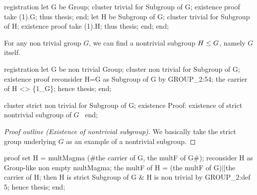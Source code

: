 \nwenddocs{}\endmoddef\nwstartdeflinemarkup{}\nwenddeflinemarkup
registration
  let G be Group;
  cluster trivial for Subgroup of G;
  existence
  proof
    take (1).G;
    thus thesis;
  end;
  let H be Subgroup of G;
  cluster trivial for Subgroup of H;
  existence
  proof
    take (1).H;
    thus thesis;
  end;
end;
\eatline
{}\nwendcode{}\nwdocspar
\begin{registration}
For any non trivial group $G$, we can find a nontrivial subgroup
$H\leq G$, namely $G$ itself.
\end{registration}

\nwenddocs{}\endmoddef\nwstartdeflinemarkup{}\nwenddeflinemarkup
registration
  let G be non trivial Group;
  cluster non trivial for Subgroup of G;
  existence
  proof
    reconsider H=G as Subgroup of G by GROUP_2:54;
    the carrier of H <> \{1_G\};
    hence thesis;
  end;

  cluster strict non trivial for Subgroup of G;
  existence
  \LA{}Proof: existence of strict nontrivial subgroup of $G$~{\nwtagstyle{}}\RA{}
end;
\nwendcode{}\nwdocspar


\begin{proof}[Proof outline (Existence of nontrivial subgroup)]
We basically take the strict group underlying $G$ as an example of a
nontrivial subgroup.
\end{proof}

\nwenddocs{}\endmoddef\nwstartdeflinemarkup{}\nwenddeflinemarkup
proof
  set H = multMagma (#the carrier of G, the multF of G#);
  reconsider H as Group-like non empty multMagma;
  the multF of H = (the multF of G)||the carrier of H;
  then H is strict Subgroup of G & H is non trivial by GROUP_2:def 5;
  hence thesis;
end;
\nwendcode{}\nwdocspar

